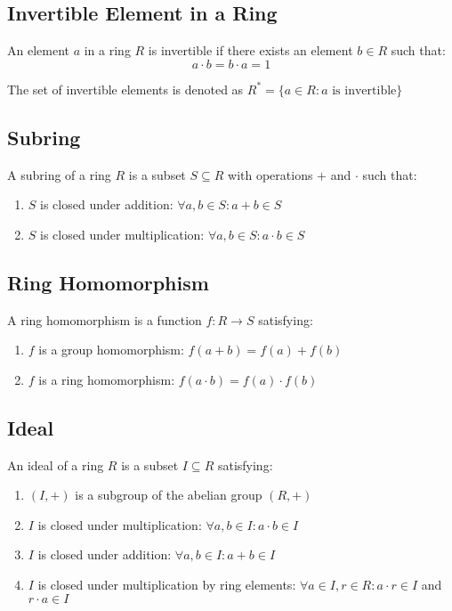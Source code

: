 \documentclass{article}
\begin{document}
\subsection{Invertible Element in a Ring}

An element \( a \) in a ring \( R \) is invertible if there exists an element \( b \in R \) such that:
\[ a \cdot b = b \cdot a = 1 \]

The set of invertible elements is denoted as \( R^* = \{ a \in R : a \text{ is invertible} \} \)

\subsection{Subring}

A subring of a ring \( R \) is a subset \( S \subseteq R \) with operations \( + \) and \( \cdot \) such that:
\begin{enumerate}
    \item \( S \) is closed under addition: \( \forall a, b \in S: a + b \in S \)
    \item \( S \) is closed under multiplication: \( \forall a, b \in S: a \cdot b \in S \)
\end{enumerate}

\subsection{Ring Homomorphism}

A ring homomorphism is a function \( f: R \to S \) satisfying:
\begin{enumerate}
    \item \( f \) is a group homomorphism: \( f(a + b) = f(a) + f(b) \)
    \item \( f \) is a ring homomorphism: \( f(a \cdot b) = f(a) \cdot f(b) \)
\end{enumerate}

\subsection{Ideal}

An ideal of a ring \( R \) is a subset \( I \subseteq R \) satisfying:
\begin{enumerate}
    \item \( (I, +) \) is a subgroup of the abelian group \( (R, +) \)
    \item \( I \) is closed under multiplication: \( \forall a, b \in I: a \cdot b \in I \)
    \item \( I \) is closed under addition: \( \forall a, b \in I: a + b \in I \)
    \item \( I \) is closed under multiplication by ring elements: \( \forall a \in I, r \in R: a \cdot r \in I \) and \( r \cdot a \in I \)
\end{enumerate}
\end{document}
